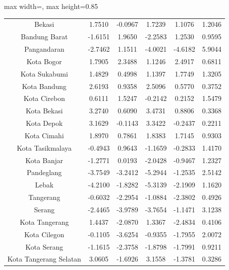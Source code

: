 \begin{table}[H]
\begin{adjustbox}{max width=\textwidth, max height=0.85\textheight}
\begin{tabular}{|c|c|c|c|c|c|}
Bekasi & 1.7510 & -0.0967 & 1.7239 & 1.1076 & 1.2046 \\
Bandung Barat & -1.6151 & 1.9650 & -2.2583 & 1.2530 & 0.9595 \\
Pangandaran & -2.7462 & 1.1511 & -4.0021 & -4.6182 & 5.9044 \\
Kota Bogor & 1.7905 & 2.3488 & 1.1246 & 2.4917 & 0.6811 \\
Kota Sukabumi & 1.4829 & 0.4998 & 1.1397 & 1.7749 & 1.3205 \\
Kota Bandung & 2.6193 & 0.9358 & 2.5096 & 0.5770 & 0.3752 \\
Kota Cirebon & 0.6111 & 1.5247 & -0.2142 & 0.2152 & 1.5479 \\
Kota Bekasi & 3.2740 & 0.6090 & 3.4731 & 0.8806 & 0.3368 \\
Kota Depok & 3.1629 & -0.1143 & 3.3422 & -0.2437 & 0.2211 \\
Kota Cimahi & 1.8970 & 0.7861 & 1.8383 & 1.7145 & 0.9303 \\
Kota Tasikmalaya & -0.4943 & 0.9643 & -1.1659 & -0.2833 & 1.4170 \\
Kota Banjar & -1.2771 & 0.0193 & -2.0428 & -0.9467 & 1.2327 \\
Pandeglang & -3.7549 & -3.2412 & -5.2944 & -1.2535 & 2.5142 \\
Lebak & -4.2100 & -1.8282 & -5.3139 & -2.1909 & 1.1620 \\
Tangerang & -0.6032 & -2.2954 & -1.0884 & -2.3802 & 0.4926 \\
Serang & -2.4465 & -3.9789 & -3.7654 & -1.1471 & 3.1238 \\
Kota Tangerang & 1.4437 & -2.0870 & 1.3367 & -2.4834 & 0.4106 \\
Kota Cilegon & -0.1105 & -3.6254 & -0.9355 & -1.7955 & 2.0072 \\
Kota Serang & -1.1615 & -2.3758 & -1.8798 & -1.7991 & 0.9211 \\
Kota Tangerang Selatan & 3.0605 & -1.6926 & 3.1558 & -1.3781 & 0.3286 \\
\hline
\end{tabular}
\end{adjustbox}
\end{table}